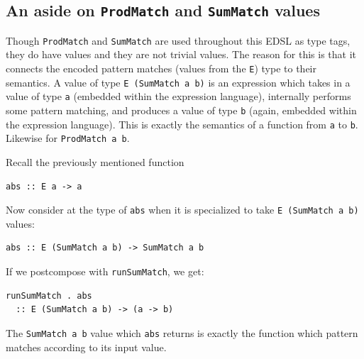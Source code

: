 \documentclass[sigplan,anonymous,review]{acmart}
\newcommand{\ttt}{\texttt}
\newcommand{\showtodos}{}  %
\newenvironment{todo}
  {\ifthenelse{\isundefined{\showtodos}}{\comment}{\begin{tcolorbox}
    \textbf{TODO}:}}
  {\ifthenelse{\isundefined{\showtodos}}{\endcomment}{\end{tcolorbox}}
  }
\begin{document}



\subsection{An aside on \ttt{ProdMatch} and \ttt{SumMatch} values}
\label{sec:MatchAside}

Though \ttt{ProdMatch} and \ttt{SumMatch} are used throughout this EDSL as type
tags, they do have values and they are not trivial values. The reason for this
is that it connects the encoded pattern matches (values from the \ttt{E}) type
to their semantics. A value of type \ttt{E (SumMatch a b)} is an expression
which takes in a value of type \ttt{a} (embedded within the expression
language), internally performs some pattern matching, and produces a value of
type \ttt{b} (again, embedded within the expression language). This is exactly
the semantics of a function from \ttt{a} to \ttt{b}. Likewise for \ttt{ProdMatch a b}.

Recall the previously mentioned function

\begin{lstlisting}
abs :: E a -> a
\end{lstlisting}

Now consider at the type of \ttt{abs} when it is specialized to take
\ttt{E (SumMatch a b)} values:

\begin{lstlisting}
abs :: E (SumMatch a b) -> SumMatch a b
\end{lstlisting}

If we postcompose with \ttt{runSumMatch}, we get:

\begin{lstlisting}
runSumMatch . abs
  :: E (SumMatch a b) -> (a -> b)
\end{lstlisting}

The \ttt{SumMatch a b} value which \ttt{abs} returns is exactly the function
which pattern matches according to its input value.
\end{document}
